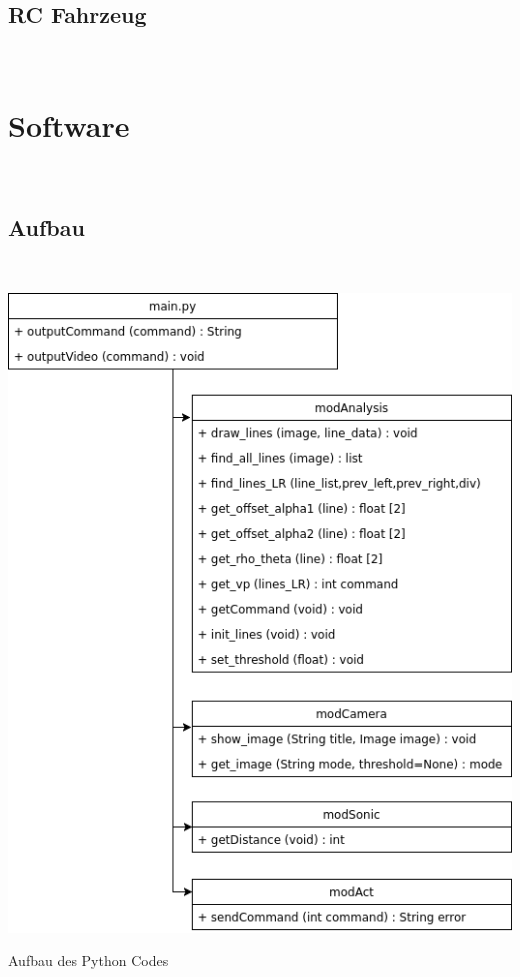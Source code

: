 \documentclass[a4paper,12pt]{article}
\begin{document}
    \subsection{RC Fahrzeug}
    \ \\
  
  \section{Software}
    \ \\
    \subsection{Aufbau}
    \ \\
    \begin{minipage}{\columnwidth}
      \makeatletter
      \def\@captype{figure}
      \makeatother
      \centering
      \includegraphics[width=0.8\linewidth]{images/code-flowchart.png}
      \caption{Aufbau des Python Codes}
      \label{fig:image-01}
    \end{minipage}
    \ \\
\end{document}
